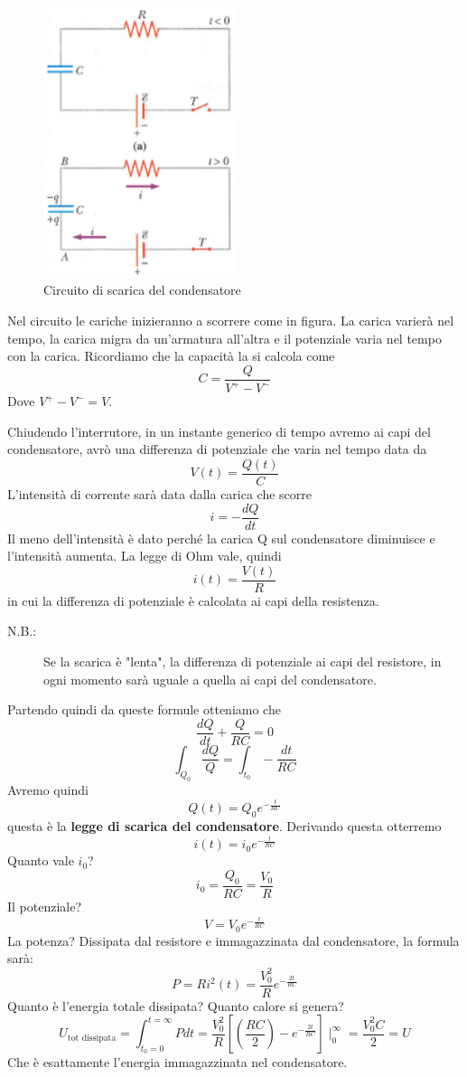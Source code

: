 \documentclass[a4paper, 12pt]{book}
\theoremstyle{plain}
\begin{document}
\begin{figure}
    \includegraphics[width=0.5\textwidth]{scarica.png}
    \caption{Circuito di scarica del condensatore}
\end{figure}
Nel circuito le cariche inizieranno a scorrere 
come in figura. La carica varierà nel tempo, la carica 
migra da un'armatura all'altra e il potenziale varia nel
tempo con la carica. Ricordiamo che la capacità la si 
calcola come \[ C = \frac{Q}{V^+ - V^-} \]
Dove $V^+ - V^- = V$.

Chiudendo l'interrutore, in un instante generico di tempo 
avremo ai capi del condensatore, avrò una differenza di potenziale 
che varia nel tempo data da \[ V(t) = \frac{Q(t)}{C} \]
L'intensità di corrente sarà data dalla carica che scorre 
\[ i = -\frac{dQ}{dt} \] Il meno dell'intensità è dato 
perché la carica Q sul condensatore diminuisce e l'intensità 
aumenta. La legge di Ohm vale, quindi \[ i(t) = \frac{V(t)}{R} \] 
in cui la differenza di potenziale è calcolata ai capi 
della resistenza.

\begin{description}
    \item[N.B.:] Se la scarica è "lenta", la differenza di potenziale ai capi 
    del resistore, in ogni momento sarà uguale a quella 
    ai capi del condensatore. 
\end{description}
Partendo quindi da queste formule otteniamo che 
\[ \frac{dQ}{dt} + \frac{Q}{RC} = 0 \] 
\[\int_{Q_0} \frac{dQ}{Q} = \int_{t_0} -\frac{dt}{RC} \] 
Avremo quindi \[ Q(t) = Q_0 e^{-\frac{t}{RC}} \] 
questa è la \textbf{legge di scarica del condensatore}. 
Derivando questa otterremo \[ i(t) = i_0 e^{-\frac{t}{RC}} \]
Quanto vale $i_0$? \[ i_0 = \frac{Q_0}{RC} = \frac{V_0}{R} \] 
Il potenziale? \[ V = V_0 e^{-\frac{t}{RC}} \]
La potenza? Dissipata dal resistore e immagazzinata 
dal condensatore, la formula sarà: \[ P = Ri^2(t) = \frac{V_0^2}{R} e^{-\frac{2t}{RC}} \] 
Quanto è l'energia totale dissipata? Quanto calore si genera? 
\[ U_{\textrm{tot dissipata}} = \int_{t_0 = 0}^{t = \infty} Pdt = \frac{V_0^2}{R} [(\frac{RC}{2})-e^{-\frac{2t}{RC}}]\mid_0^\infty = \frac{V_0^2C}{2} = U\] 
Che è esattamente l'energia immagazzinata nel condensatore.
\end{document}
